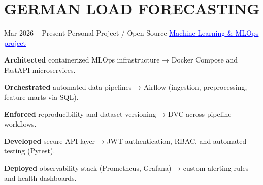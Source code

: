 \section{GERMAN LOAD FORECASTING}

\cvexperince
  {Mar 2026 – Present}
  {Personal Project / Open Source}
  {\href{https://github.com/saeed-amiri/german-load-forecasting-mlops}{\textcolor{blue}{\underline{Machine Learning \& MLOps project \faGithub}}}}
  {

  \item \textbf{Architected} containerized MLOps infrastructure → Docker Compose and FastAPI microservices.
  \item \textbf{Orchestrated} automated data pipelines → Airflow (ingestion, preprocessing, feature marts via SQL).
  \item \textbf{Enforced} reproducibility and dataset versioning → DVC across pipeline workflows.
  \item \textbf{Developed} secure API layer → JWT authentication, RBAC, and automated testing (Pytest).
  \item \textbf{Deployed} observability stack (Prometheus, Grafana) → custom alerting rules and health dashboards.

  }